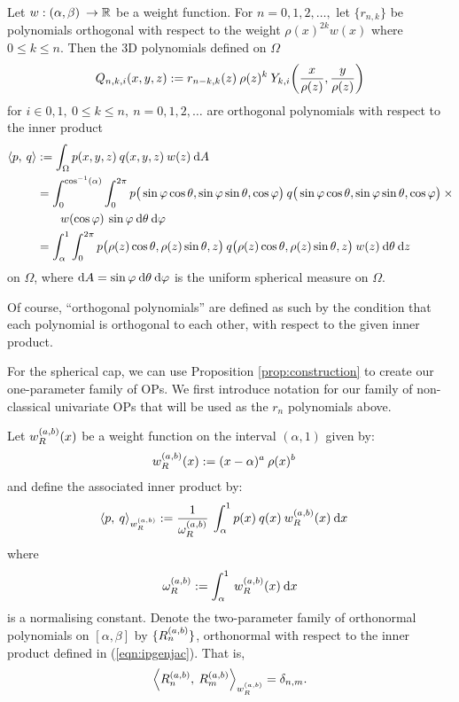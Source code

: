 \documentclass[11pt, oneside]{article}   	%
\begin{document}
\begin{proposition}\label{prop:construction}
	Let $w : (\alpha,\beta) \: \to \mathbb{R}$ be a weight function. For $n = 0,1,2,\dots, $ let $\{r_{n,k}\}$ be polynomials orthogonal with respect to the weight $\rho(x)^{2k} w(x)$ where $0 \le k \le n$. Then the 3D polynomials defined on $\Omega$
\begin{align*}
	\scopnki(x,y,z) := r_{n-k,k}(z) \: \rho(z)^k \: \ch_{k,i}\fpr({x \over \rho(z)}, {y \over \rho(z)})
\end{align*}
for $i \in {0,1}, \: 0 \le k \le n, \: n = 0,1,2,\dots$ are orthogonal polynomials with respect to the inner product
\begin{align*}
	\ip< p, \: q > &:= \int_\Omega p(x,y,z) \: q(x,y,z) \: w(z) \: \D A \\
	&= \int_0^{\cos^{-1}(\alpha)} \int_0^{2\pi} p\big(\sinphi \costheta, \sinphi \sintheta, \cosphi \big) \: q\big(\sinphi \costheta, \sinphi \sintheta, \cosphi \big) \: \times \\
	&\qquad w(\cosphi) \: \sinphi \: \D \theta \: \D \varphi \\
	&= \int_\alpha^1 \int_0^{2\pi} p\big(\rho(z) \cos\theta, \rho(z) \sin\theta, z\big) \: q\big(\rho(z) \cos\theta, \rho(z) \sin \theta, z\big) \: w(z) \: \D \theta \: \D z
\end{align*}
on $\Omega$, where ${\rm d} A = \sin\varphi \: {\rm d} \theta \: {\rm d} \varphi$ is the uniform spherical measure on $\Omega$. 
\end{proposition}
Of course, \enquote{orthogonal polynomials} are defined as such by the condition that each polynomial is orthogonal to each other, with respect to the given inner product.

For the spherical cap, we can use Proposition \ref{prop:construction} to create our one-parameter family of OPs. We first introduce notation for our family of non-classical univariate OPs that will be used as the $r_n$ polynomials above.
\begin{definition}\label{def:OPconstruction}
	Let $w_R^{(a,b)}(x)$ be a weight function on the interval $(\alpha, 1)$ given by:
\begin{align*}
	w_R^{(a,b)}(x) &:= (x - \alpha)^{a} \: \rho(x)^{b}
\end{align*}
and define the associated inner product by:
\begin{align}
	\ip< p, \: q >_{\genjacw^{(a,b)}} &:= \frac{1}{\normgenjac^{(a,b)}} \: \int_\alpha^1 p(x) \: q(x) \: \genjacw^{(a,b)}(x) \: \D x \label{eqn:ipgenjac}
\end{align}
where
\begin{align}
	\omega_R^{(a,b)} := \int_\alpha^1 \: w_R^{(a,b)}(x) \: {\rm d} x \label{eqn:ipnormalisation}
\end{align}
is a normalising constant.
Denote the two-parameter family of orthonormal polynomials on $[\alpha,\beta]$ by $\{R_n^{(a,b)}\}$, orthonormal with respect to the inner product defined in (\ref{eqn:ipgenjac}). That is,
\begin{align}
	\ip< \genjac_n^{(a,b)}, \: \genjac_m^{(a,b)} >_{\genjacw^{(a,b)}} = \delta_{n,m}.
\end{align}
\end{definition}
\end{document}
